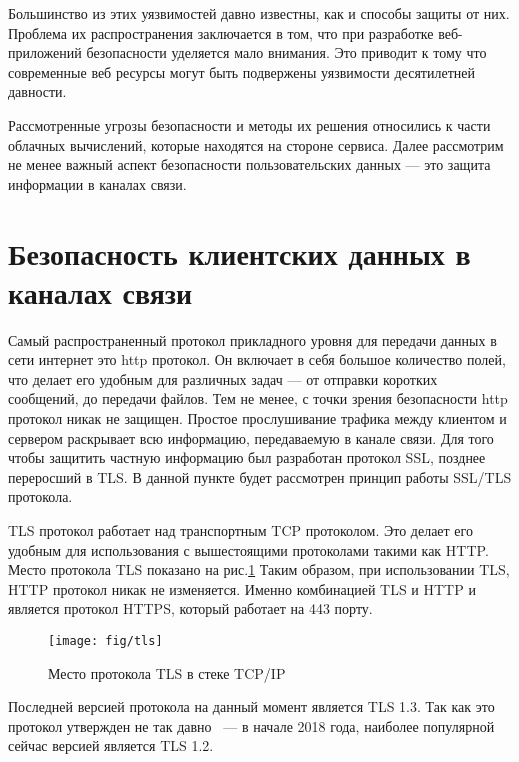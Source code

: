 Большинство из этих уязвимостей давно известны, как и способы защиты от них. Проблема их распространения заключается в том, что при разработке веб-приложений безопасности уделяется мало внимания. Это приводит к тому что современные веб ресурсы могут быть подвержены уязвимости десятилетней давности.

Рассмотренные угрозы безопасности и методы их решения относились к части облачных вычислений, которые находятся на стороне сервиса. Далее рассмотрим не менее важный аспект безопасности пользовательских данных --- это защита информации в каналах связи.

\section{Безопасность клиентских данных в каналах связи}

Самый распространенный протокол прикладного уровня для передачи данных в сети интернет это http протокол. Он включает в себя большое количество полей, что делает его удобным для различных задач --- от отправки коротких сообщений, до передачи файлов. Тем не менее, с точки зрения безопасности http протокол никак не защищен. Простое прослушивание трафика между клиентом и сервером раскрывает всю информацию, передаваемую в канале связи. Для того чтобы защитить частную информацию был разработан протокол SSL, позднее переросший в TLS. В данной пункте будет рассмотрен принцип работы SSL/TLS протокола. 

TLS протокол работает над транспортным TCP протоколом. Это делает его удобным для использования с вышестоящими протоколами такими как HTTP. Место протокола TLS показано на рис.\ref{fig:TLSinTCPIP} Таким образом, при использовании TLS, HTTP протокол никак не изменяется. Именно комбинацией TLS и HTTP и является протокол HTTPS, который работает на 443 порту.

\begin{figure}[h]
	\centering
	\texttt{[image: fig/tls]}
	\caption{Место протокола TLS в стеке TCP/IP}
	\label{fig:TLSinTCPIP}
\end{figure}

Последней версией протокола на данный момент является TLS 1.3. Так как это протокол утвержден не так давно~\cite{Kinsta} ---  в начале 2018 года, наиболее популярной сейчас версией является TLS 1.2.

